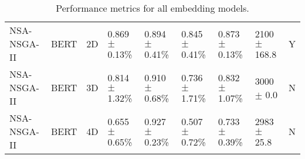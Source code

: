 \begin{table*}[h]
{\begin{tabular}{lllllllll}
NSA-NSGA-II & BERT & 2D & 0.869 $\pm$ 0.13\% & 0.894 $\pm$ 0.41\% & 0.845 $\pm$ 0.41\% & 0.873 $\pm$ 0.13\% & 2100 $\pm$ 168.8 & Y \\
NSA-NSGA-II & BERT & 3D & 0.814 $\pm$ 1.32\% & 0.910 $\pm$ 0.68\% & 0.736 $\pm$ 1.71\% & 0.832 $\pm$ 1.07\% & 3000 $\pm$ 0.0 & N \\
NSA-NSGA-II & BERT & 4D & 0.655 $\pm$ 0.65\% & 0.927 $\pm$ 0.23\% & 0.507 $\pm$ 0.72\% & 0.733 $\pm$ 0.39\% & 2983 $\pm$ 25.8 & N \\
\bottomrule
\end{tabular}
    }
    \caption{Performance metrics for all embedding models.}
    \label{tab:all_embeddings_results}
\end{table*}
